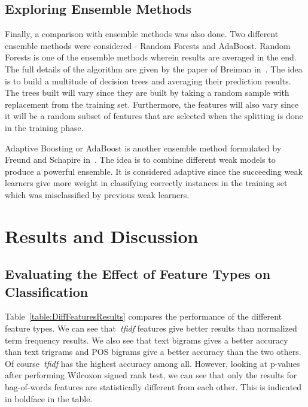 \documentclass[a4paper]{llncs}
\begin{document}
\subsection{Exploring Ensemble Methods}
Finally, a comparison with ensemble methods was also done. Two different ensemble methods were considered - Random Forests and AdaBoost. Random Forests is one of the ensemble methods wherein results are averaged in the end. The full details of the algorithm are given by the paper of Breiman in~\cite{breiman2001random}. The idea is to build a multitude of decision trees and averaging their prediction results. The trees built will vary since they are built by taking a random sample with replacement from the training set. Furthermore, the features will also vary since it will be a random subset of features that are selected when the splitting is done in the training phase. 

Adaptive Boosting or AdaBoost is another ensemble method formulated by Freund and Schapire in~\cite{freund1997decision}. The idea is to combine different weak models to produce a powerful ensemble. It is considered adaptive since the succeeding weak learners give more weight in classifying correctly instances in the training set which was misclassified by previous weak learners. 

\section{Results and Discussion}
\subsection{Evaluating the Effect of Feature Types on Classification}
Table~\ref{table:DiffFeaturesResults} compares the performance of the different feature types. We can see that~\textit{tfidf} features give better results than normalized term frequency results. We also see that text bigrams gives a better accuracy than text trigrams and POS bigrams give a better accuracy than the two others. Of course~\textit{tfidf} has the highest accuracy among all. However, looking at p-values after performing Wilcoxon signed rank test, we can see that only the results for bag-of-words features are statistically different from each other. This is indicated in boldface in the table. 

\end{document}
